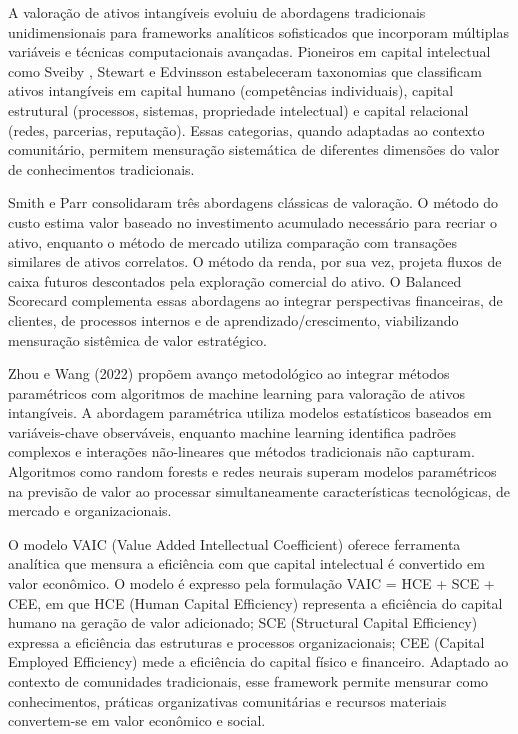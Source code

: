 A valoração de ativos intangíveis evoluiu de abordagens tradicionais unidimensionais \cite{SmithParr2000} para frameworks analíticos sofisticados que incorporam múltiplas variáveis e técnicas computacionais avançadas. Pioneiros em capital intelectual como Sveiby \cite{Sveiby1997}, Stewart \cite{Stewart1997} e Edvinsson \cite{Edvinsson1997} estabeleceram taxonomias que classificam ativos intangíveis em capital humano (competências individuais), capital estrutural (processos, sistemas, propriedade intelectual) e capital relacional (redes, parcerias, reputação). Essas categorias, quando adaptadas ao contexto comunitário, permitem mensuração sistemática de diferentes dimensões do valor de conhecimentos tradicionais.

Smith e Parr \cite{SmithParr2000} consolidaram três abordagens clássicas de valoração. O método do custo estima valor baseado no investimento acumulado necessário para recriar o ativo, enquanto o método de mercado utiliza comparação com transações similares de ativos correlatos. O método da renda, por sua vez, projeta fluxos de caixa futuros descontados pela exploração comercial do ativo. O Balanced Scorecard \cite{Kaplan1996} complementa essas abordagens ao integrar perspectivas financeiras, de clientes, de processos internos e de aprendizado/crescimento, viabilizando mensuração sistêmica de valor estratégico.

Zhou e Wang (2022) propõem avanço metodológico ao integrar métodos paramétricos com algoritmos de machine learning para valoração de ativos intangíveis. A abordagem paramétrica utiliza modelos estatísticos baseados em variáveis-chave observáveis, enquanto machine learning identifica padrões complexos e interações não-lineares que métodos tradicionais não capturam. Algoritmos como random forests e redes neurais superam modelos paramétricos na previsão de valor ao processar simultaneamente características tecnológicas, de mercado e organizacionais.

O modelo VAIC (Value Added Intellectual Coefficient) \cite{Pulic2000} oferece ferramenta analítica que mensura a eficiência com que capital intelectual é convertido em valor econômico. O modelo é expresso pela formulação VAIC = HCE + SCE + CEE, em que HCE (Human Capital Efficiency) representa a eficiência do capital humano na geração de valor adicionado; SCE (Structural Capital Efficiency) expressa a eficiência das estruturas e processos organizacionais; CEE (Capital Employed Efficiency) mede a eficiência do capital físico e financeiro. Adaptado ao contexto de comunidades tradicionais, esse framework permite mensurar como conhecimentos, práticas organizativas comunitárias e recursos materiais convertem-se em valor econômico e social.

